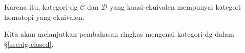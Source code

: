 Karena itu, kategori-dg $\mathcal{C}$ dan $\mathcal{D}$ yang kuasi-ekuivalen
mempunyai kategori homotopi yang ekuivalen.

Kita akan melanjutkan pembahasan ringkas mengenai kategori-dg dalam
\S\ref{sec:dg-closed}.
